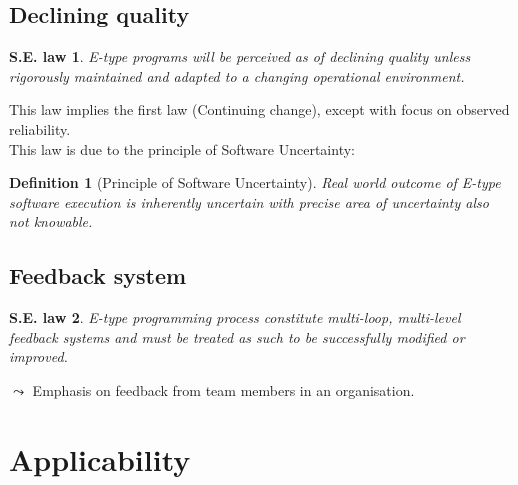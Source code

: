 \documentclass[a4paper,11pt]{report}
\newtheorem{definition}{Definition}
\newtheorem{law}{S.E. law}
\begin{document}
\subsection{Declining quality}
\begin{law}
E-type programs will be perceived as of declining quality unless rigorously
maintained and adapted to a changing operational environment.
\end{law}

This law implies the first law (Continuing change), except with focus on
observed reliability.\\

This law is due to the principle of Software Uncertainty:
\begin{definition}[Principle of Software Uncertainty]
Real world outcome of E-type software execution is inherently uncertain with
precise area of uncertainty also not knowable.
\end{definition}

\subsection{Feedback system}
\begin{law}
E-type programming process constitute multi-loop, multi-level feedback
systems and must be treated as such to be successfully modified or improved.
\end{law}

$\leadsto$ Emphasis on feedback from team members in an organisation.

\section{Applicability}
\end{document}
